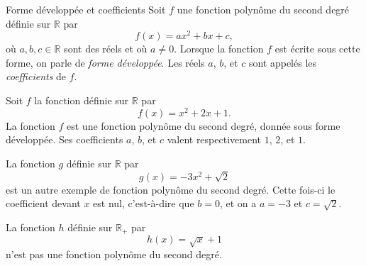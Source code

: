 \documentclass[11pt]{article}
\begin{document}
\begin{defi}{Forme développée et coefficients}
  Soit $f$ une fonction polynôme du second degré définie sur $\mathbb{R}$ par
  \[
    f(x) = ax^2+bx+c,
  \]
  où $a,b,c\in\mathbb{R}$ sont des réels et où $a\neq0$. Lorsque la fonction $f$
  est écrite sous cette forme, on parle de \emph{forme développée}. Les réels
  $a$, $b$, et $c$ sont appelés les \emph{coefficients} de $f$.
\end{defi}

\begin{exemple}
  Soit $f$ la fonction définie sur $\mathbb{R}$ par
  \[
    f(x) = x^2+2x+1.
  \]
  La fonction $f$ est une fonction polynôme du second degré, donnée sous forme
  développée. Ses coefficients $a$, $b$, et $c$ valent respectivement $1$, $2$,
  et $1$.
\begin{center}
\end{center}

\end{exemple}

\begin{exemple}
  La fonction $g$ définie sur $\mathbb{R}$ par
  \[
    g(x) = -3x^2+\sqrt 2
  \]
  est un autre exemple de fonction polynôme du second degré. Cette fois-ci le
  coefficient devant $x$ est nul, c'est-à-dire que $b=0$, et on a $a=-3$ et
  $c=\sqrt2$.

\begin{center}
\end{center}

\end{exemple}

\begin{contrex}
  La fonction $h$ définie sur $\mathbb{R}_+$ par
  \[
    h(x) = \sqrt x + 1
  \]
  n'est pas une fonction polynôme du second degré.
\begin{center}
\end{center}

\end{contrex}
\end{document}
